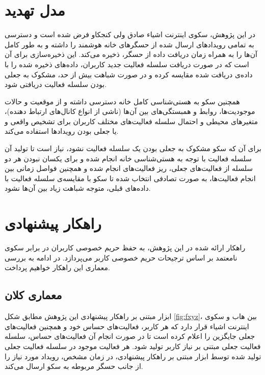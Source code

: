 \section{مدل تهدید}\label{chapter:c42}

در این پژوهش، سکوی اینترنت اشیاء صادق ولی کنجکاو فرض شده است و دسترسی به تمامی رویدادهای ارسال شده از حسگرهای خانه هوشمند را داشته و به طور کامل آن‌ها را به همراه زمان دریافت داده از حسگر، ذخیره می‌کند. این ذخیره‌سازی برای آن است که در صورت دریافت سلسله فعالیت جدید کاربران، داده‌های ذخیره شده را با داده‌ی دریافت شده مقایسه کرده و در صورت شباهت بیش از حد، مشکوک به جعلی بودن سلسله فعالیت دریافتی شود.

همچنین سکو به هستی‌شناسی کامل خانه دسترسی داشته و از موقعیت و حالات موجودیت‌ها، روابط و همبستگی‌های بین آن‌ها (ناشی از انواع کانال‌های ارتباط دهنده)، متغیرهای محیطی و احتمال سلسله فعالیت‌های مختلف کاربران برای تشخیص واقعی و یا جعلی بودن رویدادها استفاده می‌کند.

برای آن که سکو مشکوک به جعلی بودن یک سلسله فعالیت نشود، نیاز است تا تولید آن سلسله فعالیت با توجه به هستی‌شناسی خانه انجام شده و برای یکسان نبودن هر دو سلسله از فعالیت‌های جعلی، ریز فعالیت‌های انجام شده و همچنین فواصل زمانی بین انجام فعالیت‌ها، به صورت تصادفی انتخاب شده تا سکو با مقایسه‌ی سلسله فعالیت با داده‌های قبلی، متوجه شباهت زیاد بین آن‌ها نشود.

\section{راهکار پیشنهادی}

راهکار ارائه شده در این پژوهش، به حفظ حریم خصوصی کاربران در برابر سکوی نامعتمد بر اساس ترجیحات حریم خصوصی کاربر می‌پردازد. در ادامه به بررسی معماری این راهکار خواهیم پرداخت.

\subsection{معماری کلان}

ابزار مبتنی بر راهکار پیشنهادی این پژوهش مطابق شکل \ref{fig:fxyz}، بین هاب و سکوی اینترنت اشیاء قرار دارد که هر کاربر، فعالیت‌های حساس خود و همچنین فعالیت‌های‌ جعلی جایگزین را اعلام کرده است تا در صورت انجام آن فعالیت‌های حساس، سلسله فعالیت جعلی مبتنی بر نیاز کاربر تولید شود. هر‌ فعالیت موجود در سلسله فعالیت جعلی تولید شده توسط ابزار مبتنی بر راهکار پیشنهادی، در زمان مشخص، رویداد مورد نیاز را از جانب حسگر مربوطه به سکو ارسال می‌کند.

